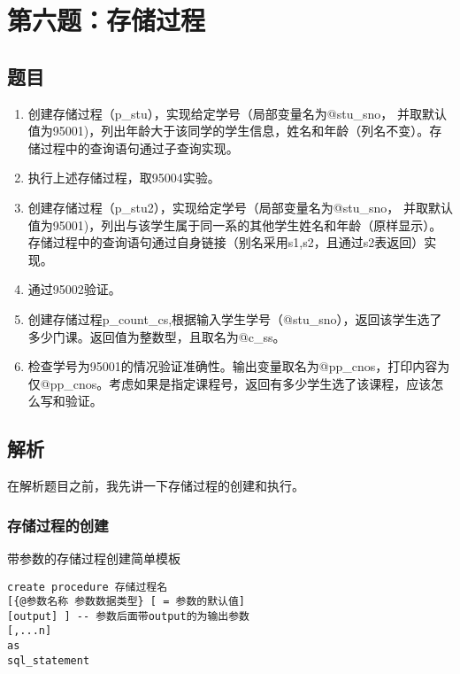 \section{第六题：存储过程}

\subsection{题目}

\begin{enumerate}
\item 创建存储过程（p\_stu），实现给定学号（局部变量名为@stu\_sno， 并取默认值为95001)，列出年龄大于该同学的学生信息，姓名和年龄（列名不变）。存储过程中的查询语句通过子查询实现。
\item 执行上述存储过程，取95004实验。
\item 创建存储过程（p\_stu2），实现给定学号（局部变量名为@stu\_sno， 并取默认值为95001)，列出与该学生属于同一系的其他学生姓名和年龄（原样显示）。存储过程中的查询语句通过自身链接（别名采用s1,s2，且通过s2表返回）实现。
\item 通过95002验证。
\item 创建存储过程p\_count\_cs,根据输入学生学号（@stu\_sno），返回该学生选了多少门课。返回值为整数型，且取名为@c\_ss。
\item 检查学号为95001的情况验证准确性。输出变量取名为@pp\_cnos，打印内容为仅@pp\_cnos。考虑如果是指定课程号，返回有多少学生选了该课程，应该怎么写和验证。
\end{enumerate}

\subsection{解析}

\qquad 在解析题目之前，我先讲一下存储过程的创建和执行。

\subsubsection{存储过程的创建}

\qquad 带参数的存储过程创建简单模板

\begin{mdframed}[backgroundcolor=gray!10]
\begin{verbatim}
create procedure 存储过程名
[{@参数名称 参数数据类型} [ = 参数的默认值]
[output] ] -- 参数后面带output的为输出参数
[,...n]
as
sql_statement
\end{verbatim}
\end{mdframed}

